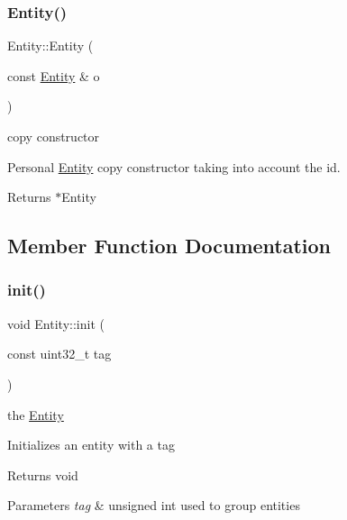 \subsubsection{\texorpdfstring{Entity()}{Entity()}\hspace{0.1cm}{\footnotesize\ttfamily [2/2]}}
{\footnotesize\ttfamily Entity\+::\+Entity (\begin{DoxyParamCaption}\item[{const \hyperlink{class_entity}{Entity} \&}]{o }\end{DoxyParamCaption})}

copy constructor

Personal \hyperlink{class_entity}{Entity} copy constructor taking into account the id.

\begin{DoxyReturn}{Returns}
$\ast$\+Entity 
\end{DoxyReturn}


\subsection{Member Function Documentation}
\mbox{\label{class_entity_a085fa2dd2c2b1f3f60d601a68d5c6773}} 
\subsubsection{\texorpdfstring{init()}{init()}\hspace{0.1cm}{\footnotesize\ttfamily [1/2]}}
{\footnotesize\ttfamily void Entity\+::init (\begin{DoxyParamCaption}\item[{const uint32\+\_\+t}]{tag }\end{DoxyParamCaption})}

the \hyperlink{class_entity}{Entity}

Initializes an entity with a tag

\begin{DoxyReturn}{Returns}
void 
\end{DoxyReturn}

\begin{DoxyParams}{Parameters}
{\em tag} & unsigned int used to group entities \\
\hline
\end{DoxyParams}
\mbox{\label{class_entity_a93bfb0b92c06297c207fad4164810fed}} 
